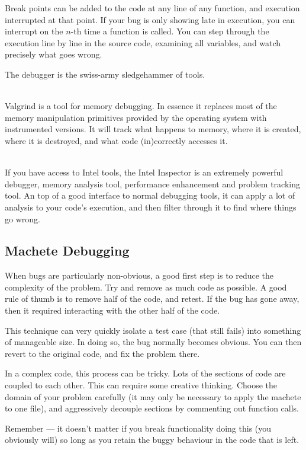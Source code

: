 \documentclass[a4paper,notitlepage]{scrreprt}
\newcommand\headitem[1]{\needspace{1.5\baselineskip}\item[{\boldmath #1 \nopagebreak}] \hfill \\ \nopagebreak}
\begin{document}
{{{\begin{description}
			Break points can be added to the code at any line of any function,
			and execution interrupted at that point. If your bug is only
			showing late in execution, you can interrupt on the $n$-th time
			a function is called. You can step through the execution line by
			line in the source code, examining all variables, and watch
			precisely what goes wrong.

			The debugger is the swiss-army sledgehammer of tools.

		\headitem{Valgrind}
			Valgrind is a tool for memory debugging. In essence it replaces
			most of the memory manipulation primitives provided by the
			operating system with instrumented versions. It will track what
			happens to memory, where it is created, where it is destroyed,
			and what code (in)correctly accesses it.

		\headitem{Intel Inspector XE}
			If you have access to Intel tools, the Intel Inspector is an
			extremely powerful debugger, memory analysis tool, performance
			enhancement and problem tracking tool. An top of a good interface
			to normal debugging tools, it can apply a lot of
			analysis to your code's execution, and then filter through it to
			find where things go wrong.
	\end{description}

\subsection{Machete Debugging}
	When bugs are particularly non-obvious, a good first step is to reduce the
	complexity of the problem. Try and remove as much code as possible. A good
	rule of thumb is to remove half of the code, and retest. If the bug has
	gone away, then it required interacting with the other half of the code.

	This technique can very quickly isolate a test case (that still fails) into
	something of manageable size. In doing so, the bug normally becomes
	obvious. You can then revert to the original code, and fix the problem
	there.

	In a complex code, this process can be tricky. Lots of the sections of code
	are coupled to each other. This can require some creative thinking. Choose
	the domain of your problem carefully (it may only be necessary to apply the
	machete to one file), and aggressively decouple sections by commenting out
	function calls.

	Remember --- it doesn't matter if you break functionality doing this (you
	obviously will) so long as you retain the buggy behaviour in the code that
	is left.

}}}
\end{document}
